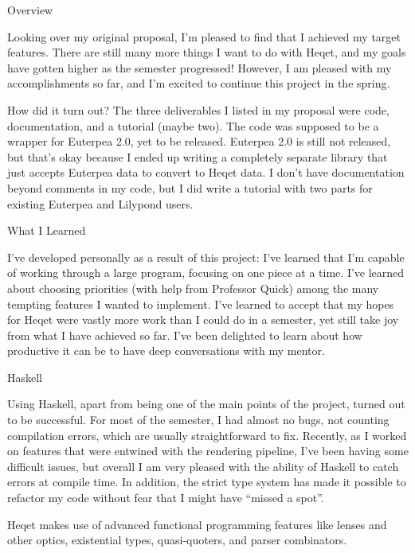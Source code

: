\documentclass{article}
\begin{document}
\begin{section}{Overview}

Looking over my original proposal, I'm pleased to find that I  achieved my target features. There are still many more things I want to do with Heqet, and my goals have gotten higher as the semester progressed! However, I am pleased with my accomplishments so far, and I'm excited to continue this project in the spring. 

\end{section}
\begin{section}{How did it turn out?}
The three deliverables I listed in my proposal were code, documentation, and a tutorial (maybe two). The code was supposed to be a wrapper for Euterpea 2.0, yet to be released. Euterpea 2.0 is still not released, but that's okay because I ended up writing a completely separate library that just accepts Euterpea data to convert to Heqet data. I don't have documentation beyond comments in my code, but I did write a tutorial with two parts for existing Euterpea and Lilypond users.

\end{section}
\begin{section}{What I Learned}

I've developed personally as a result of this project: I've learned that I'm capable of working through a large program, focusing on one piece at a time. I've learned about choosing priorities (with help from Professor Quick) among the many tempting features I wanted to implement. I've learned to accept that my hopes for Heqet were vastly more work than I could do in a semester, yet still take joy from what I have achieved so far. I've been delighted to learn about how productive it can be to have deep conversations with my mentor.

\end{section}
\begin{section}{Haskell}

Using Haskell, apart from being one of the main points of the project, turned out to be successful. For most of the semester, I had almost no bugs, not counting compilation errors, which are usually straightforward to fix. Recently, as I worked on features that were entwined with the rendering pipeline, I've been having some difficult issues, but overall I am very pleased with the ability of Haskell to catch errors at compile time. In addition, the strict type system has made it possible to refactor my code without fear that I might have ``missed a spot''. 

Heqet makes use of advanced functional programming features like lenses and other optics, existential types, quasi-quoters, and parser combinators.

\end{section}
\end{document}
